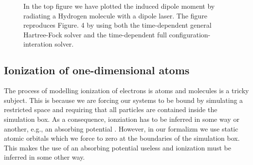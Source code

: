 \begin{figure}
                \caption{In the top figure we have plotted the induced dipole
                moment by radiating a Hydrogen molecule with a dipole laser.
                The figure reproduces Figure. 4 by \citeauthor{li_2005}
                \cite{li_2005} using both the time-dependent general
                Hartree-Fock solver and the time-dependent full
                configuration-interation solver.}
                \label{fig:dipole-moment-li}
            \end{figure}

        \subsection{Ionization of one-dimensional atoms}
            The process of modelling ionization of electrons is atoms and
            molecules is a tricky subject.
            This is because we are forcing our systems to be bound by simulating
            a restricted space and requiring that all particles are contained
            inside the simulation box.
            As a consequence, ionziation has to be inferred in some way or
            another, e.g., an absorbing potential \cite{kosloff1986363,
            miyagi_and_madsen}.
            However, in our formalizm we use static atomic orbitals which we
            force to zero at the boundaries of the simulation box.
            This makes the use of an absorbing potential useless and ionization
            must be inferred in some other way.


